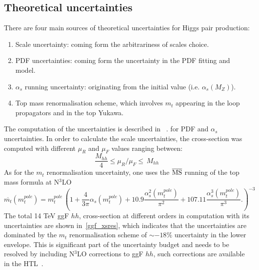 \subsection{Theoretical uncertainties}
There are four main sources of theoretical uncertainties for Higgs pair production:
\begin{enumerate}
	\item Scale uncertainty: coming form the arbitrariness of scales choice.
	\item PDF uncertainties: coming form the uncertainty in the PDF fitting and model.
	\item $\alpha_s$ running uncertainty: originating from the initial value (i.e. $\alpha_s(M_Z) $).
	\item Top mass renormalisation scheme, which involves $m_t$ appearing in the loop propagators and in the top Yukawa.
\end{enumerate}
The computation of the uncertainties is described in ~\cite{Martin:2009bu, Demartin:2010er}. for PDF and $\alpha_s$ uncertainties.
In order to calculate the scale uncertainties, the cross-section was computed with different $ \mu_R$ and $\mu_F$ values ranging between:
\begin{equation}
	\frac{M_{hh}}{4} \leq \mu_R/\mu_F  \leq \,M_{hh}
\end{equation}
As for the $m_t$ renormalisation uncertainty, one uses the $\overline{\mathrm{MS}}$ running of the top mass formula at N$^3$LO~\cite{Baglio:2020wgt}
\begin{equation}
	\overline{m_t} (m_t^{pole}) =m_t^{pole}\, \left( 1+\frac{4}{3 \pi} \alpha_s(m_t^{pole})+10.9 \frac{\alpha^2_s(m_t^{pole})}{\pi^2} +107.11 \frac{\alpha^3_s(m_t^{pole})}{\pi^3}. \right) ^{-3} 
\end{equation}
The total 14 TeV ggF $hh$, cross-section at different orders in computation with its uncertainties are shown in~\autoref{ggf_xsres}, which indicates that the uncertainties are dominated by the $m_t$ renormalisation scheme of $\sim -18\%$ uncertainty in the lower envelope.  This is significant part of the uncertainty budget and needs to be resolved by including N$^3$LO corrections to ggF $hh$, such corrections are available in the  HTL~\cite{Chen:2019lzz,Chen:2019fhs}. 
%
